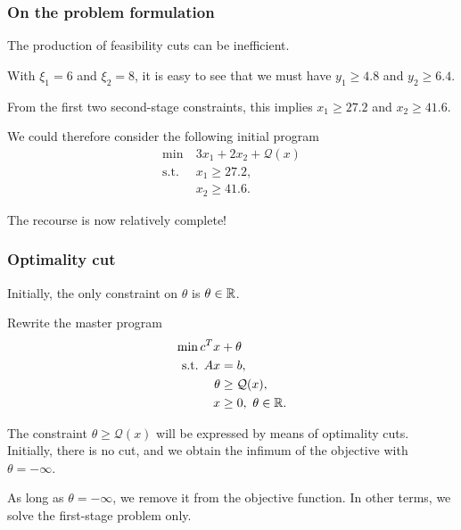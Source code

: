 \documentclass{beamer}
\begin{document}
\begin{frame}
	\frametitle{On the problem formulation}
	
	The production of feasibility cuts can be inefficient.
	
	\mbox{}
	
	With $\xi_1 = 6$ and $\xi_2 = 8$, it is easy to see that we must have $y_1 \geq	4.8$ and $y_2 \geq 6.4$.
	
	\mbox{}
	
	From the first two second-stage constraints, this implies $x_1 \geq 27.2$ and $x_2 \geq 41.6$.
	
	\mbox{}
	
	We could therefore consider the following initial program
	\begin{align*}
	\min\ & 3x_1 + 2x_2 + \mathcal{Q}(x) \\
	\mbox{s.t. } & x_1 \geq 27.2, \\
	& x_2 \geq 41.6.
	\end{align*}
	
	The recourse is now relatively complete!
	
\end{frame}


\begin{frame}
\frametitle{Optimality cut}
	
Initially, the only constraint on $\theta$ is $\theta \in {\mathbb{R}}$.
	
\mbox{}
	
Rewrite the master program
\begin{align*}
\min c^Tx & + \theta \\
\mbox{s.t. } Ax & = b, \\
\theta &\geq \mathcal{Q}(x),\\
x & \geq 0,\ \theta \in {\mathbb{R}}.
\end{align*}
	
The constraint $\theta \geq \mathcal{Q}(x)$ will be expressed by means of optimality cuts.
Initially, there is no cut, and we obtain the infimum of the objective with $\theta = -\infty$.
	
\mbox{}
	
As long as $\theta = -\infty$, we remove it from the objective function.
In other terms, we solve the first-stage problem only.
	
\end{frame}
\end{document}

